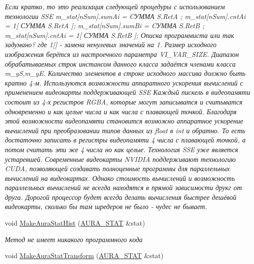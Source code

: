 \begin{DoxyCompactItemize}
\begin{DoxyCompactList}\small\item\em Если кратко, то это реализация следующей процедуры с использованием технологии S\+S\+E m\+\_\+stat\mbox{[}n\+Sum\mbox{]}.sum\+Ai = CУММА S.\+Ret\+A ; m\+\_\+stat\mbox{[}n\+Sum\mbox{]}.cnt\+Ai = 1\mbox{[} СУММА S.\+Ret\+A \mbox{]}; m\+\_\+stat\mbox{[}n\+Sum\mbox{]}.sum\+Bi = CУММА S.\+Ret\+B ; m\+\_\+stat\mbox{[}n\+Sum\mbox{]}.cnt\+Ai = 1\mbox{[} СУММА S.\+Ret\+B \mbox{]}; Описка программиста или так задумано? где 1\mbox{[}\mbox{]} -\/ замена ненулевых значений на 1. Размер исходного изображения берётся из настроечного параметра V\+I\+\_\+\+V\+A\+R\+\_\+\+S\+I\+Z\+E. Диапазон обрабатываемых строк инстансом данного класса задаётся членами класса m\+\_\+y\+S,m\+\_\+y\+E. Количество элементов в строке исходного массива должно быть кратно 4-\/м. Используются возможности аппаратного ускорения вычислений с применением видеокарты поддерживающей S\+S\+E Каждый пискель в видеопамяти состоит из 4-\/х регистров R\+G\+B\+A, которые могут записыватся и считыватся одновременно и как целые числа и как числа с плавающей точкой. Благодаря этой возможности видеопамяти становится возможно аппаратное ускорение вычислений при преобразовании типов данных из float в int и обратно. То есть достаточно записать в регистры видеопамяти 4 числа с плавающей точкой, а потом считать эти же 4 числа но как целые. Технология S\+S\+E уже является устаревшей. Современные видеокарты N\+V\+I\+D\+I\+A поддерживают технологию C\+U\+D\+A, позволяющей создавать полноценные программы для параллельных вычислений на видеокартах. Однако стоимость вычислений и возможность параллельных вычислений не всегда находятся в прямой зависимости друкг от друга. Дорогой процессор будет всегда делать вычисления быстрее дешёвой видеокарты, сколько бы там шредеров не было -\/ чудес не бывает. \end{DoxyCompactList}\item 
void \hyperlink{class_c_v_i_engine_thread_ac5a7ba8ea2d72478af174b471d73fd5c}{Make\+Aura\+Stat\+Hist} (\hyperlink{class_a_u_r_a___s_t_a_t}{A\+U\+R\+A\+\_\+\+S\+T\+A\+T} \&stat)
\begin{DoxyCompactList}\small\item\em Метод не имеет никакого программного кода \end{DoxyCompactList}\item 
void \hyperlink{class_c_v_i_engine_thread_a83784b07cdfcd4f006fbfa41aacd4d86}{Make\+Aura\+Stat\+Transform} (\hyperlink{class_a_u_r_a___s_t_a_t}{A\+U\+R\+A\+\_\+\+S\+T\+A\+T} \&stat)

\end{DoxyCompactItemize}
